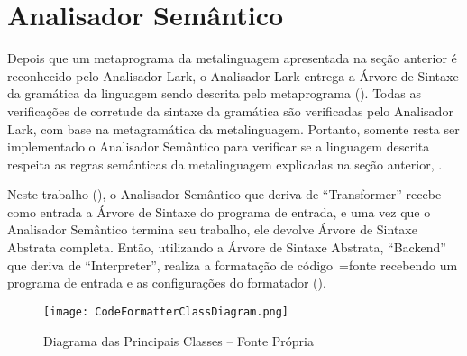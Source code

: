 \section{Analisador Semântico}

Depois que um metaprograma da metalinguagem apresentada na seção anterior é reconhecido pelo Analisador Lark,
o Analisador Lark entrega a Árvore de Sintaxe da gramática da linguagem sendo descrita pelo metaprograma ().
Todas as verificações de corretude da sintaxe da gramática são verificadas pelo Analisador Lark,
com base na metagramática da metalinguagem.
Portanto,
somente resta ser implementado o Analisador Semântico para verificar se a linguagem descrita respeita as regras semânticas da metalinguagem explicadas na seção anterior,
.

Neste trabalho (),
o Analisador Semântico que deriva de ``Transformer'' recebe como entrada a Árvore de Sintaxe do programa de entrada,
e uma vez que o Analisador Semântico termina seu trabalho,
ele devolve Árvore de Sintaxe Abstrata completa.
Então,
utilizando a Árvore de Sintaxe Abstrata,
``Backend'' que deriva de ``Interpreter'',
realiza a formatação de código~=fonte recebendo um programa de entrada e
as configurações do formatador ().
\begin{figure}[h]
\centering
\texttt{[image: CodeFormatterClassDiagram.png]}
\caption[Diagrama das Principais Classes]{Diagrama das Principais Classes -- Fonte Própria}
\label{CodeFormatterClassDiagram}
\end{figure}

